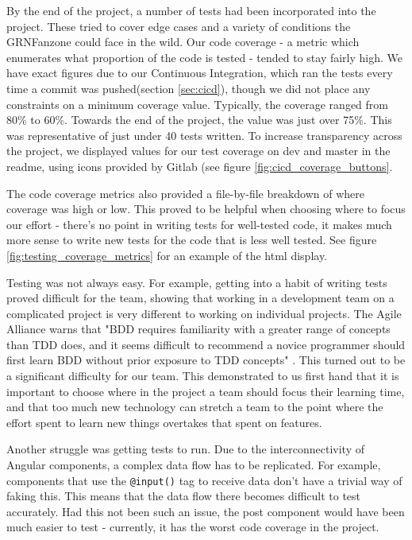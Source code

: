 \documentclass{l3proj}
\begin{document}
By the end of the project, a number of tests had been incorporated into the 
 project. These tried to cover edge cases and a variety of conditions the GRNFanzone 
 could face in the wild. Our code coverage - a metric which enumerates what 
 proportion of the code is tested - tended to stay fairly high. We have exact 
 figures due to our Continuous Integration, which ran the tests every time a 
 commit was pushed(section \ref{sec:cicd}), though we did not place any constraints 
 on a minimum coverage value. Typically, the coverage ranged from 80\% to 60\%. 
 Towards the end of the project, the value was just over 75\%. This was 
 representative of just under 40 tests written. To increase transparency 
 across the project, we displayed values for our test coverage on dev and 
 master in the readme, using icons provided by Gitlab (see figure 
 \ref{fig:cicd_coverage_buttons}.

 The code coverage metrics also provided a file-by-file breakdown of where
 coverage was high or low. This proved to be helpful when choosing
 where to focus our effort - there's no point in writing tests for
 well-tested code, it makes much more sense to write new tests for the
 code that is less well tested. See figure \ref{fig:testing_coverage_metrics}
 for an example of the html display.

Testing was not always easy. For example, getting into a habit of writing tests
 proved difficult for the team, showing that working in a development team on a
 complicated project is very different to working on individual projects. The
 Agile Alliance warns that "BDD requires familiarity with a greater range of
 concepts than TDD does, and it seems difficult to recommend a novice programmer
 should first learn BDD without prior exposure to TDD concepts"
 \cite{agilealliance_bdd}. This turned out to be a significant difficulty for
 our team. This demonstrated to us first hand that it is important to choose where
 in the project a team should focus their learning time, and that too much new technology
 can stretch a team to the point where the effort spent to learn new things 
 overtakes that spent on features.

Another struggle was getting tests to run. Due to the interconnectivity of
 Angular components, a complex data flow has to be replicated. For example,
 components that use the \texttt{@input()} tag to receive data don't have a
 trivial way of faking this. This means that the data flow there becomes
 difficult to test accurately. Had this not been such an issue, the post
 component would have been much easier to test - currently, it has the worst
 code coverage in the project.
\end{document}
